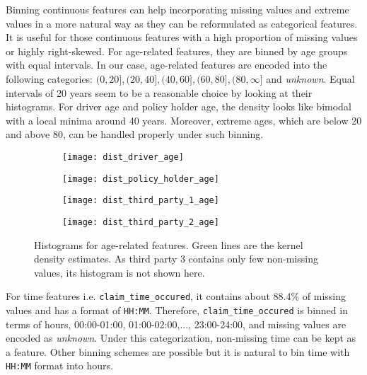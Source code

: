 \documentclass[12pt]{article}
\begin{document}
Binning continuous features can help incorporating missing values and extreme values in a more natural way as they can be reformulated as categorical features. It is useful for those continuous features with a high proportion of missing values or highly right-skewed. For age-related features, they are binned by age groups with equal intervals. In our case, age-related features are encoded into the following categories: $(0, 20], (20, 40], (40, 60], (60, 80], (80, \infty]$ and \textit{unknown}. Equal intervals of 20 years seem to be a reasonable choice by looking at their histograms. For driver age and policy holder age, the density looks like bimodal with a local minima around 40 years. Moreover, extreme ages, which are below 20 and above 80, can be handled properly under such binning. 

\begin{figure}[h]
\centering
\begin{subfigure}{.5\textwidth}
  \centering
  \texttt{[image: dist\_driver\_age]}
  \label{fig:sub1}
\end{subfigure}%
\begin{subfigure}{.5\textwidth}
  \centering
  \texttt{[image: dist\_policy\_holder\_age]}
  \label{fig:sub2}
\end{subfigure}
\vspace{-1cm}
\begin{subfigure}{.5\textwidth}
  \centering
  \texttt{[image: dist\_third\_party\_1\_age]}
  \label{fig:sub3}
\end{subfigure}%
\begin{subfigure}{.5\textwidth}
  \centering
  \texttt{[image: dist\_third\_party\_2\_age]}
  \label{fig:sub4}
\end{subfigure}
\caption{Histograms for age-related features. Green lines are the kernel density estimates. As third party 3 contains only few non-missing values, its histogram is not shown here.}
\label{fig:feature_engineering_age}
\end{figure}

For time features i.e. \texttt{claim\_time\_occured}, it contains about 88.4\% of missing values and has a format of \texttt{HH:MM}. Therefore, \texttt{claim\_time\_occured} is binned in terms of hours, 00:00-01:00, 01:00-02:00,..., 23:00-24:00, and missing values are encoded as \textit{unknown}. Under this categorization, non-missing time can be kept as a feature. Other binning schemes are possible but it is natural to bin time with \texttt{HH:MM} format into hours.\\  
\end{document}

